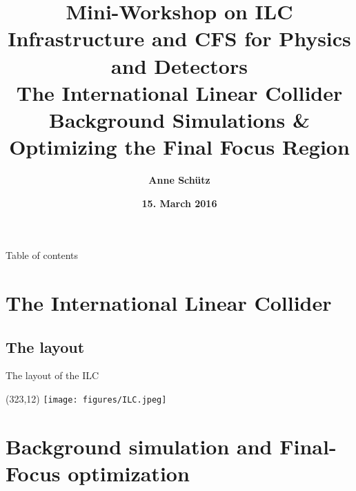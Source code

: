 \documentclass[xcolor={dvipsnames}]{beamer}
\title[ILC \& Background Simulations]{\textbf{\alert{Mini-Workshop on ILC Infrastructure and CFS for Physics and Detectors} \\\LARGE The International Linear Collider \\ \small Background Simulations \& Optimizing the Final Focus Region}}
\author{\textbf{Anne Sch\"utz}}
\institute{\textbf{KIT, DESY}}
\date{\textbf{15. March 2016}}
\newcommand{\ilclogo}{
  \setlength{\TPHorizModule}{1pt}
  \setlength{\TPVertModule}{1pt}
  \begin{textblock}{1}(323,12)
   \texttt{[image: figures/ILC.jpeg]}
  \end{textblock}
}
\begin{document}
{
\begin{frame}
  \titlepage
\end{frame}
}

\begin{frame}{Table of contents}
  \tableofcontents
\end{frame}


\section{The International Linear Collider}

\subsection{The layout}
\begin{frame}{The layout of the ILC}
\ilclogo
\begin{center}
\end{center}
\end{frame}

\section{Background simulation and Final-Focus optimization}
\end{document}
